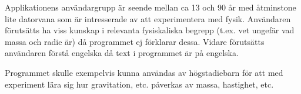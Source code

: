 Applikationens användargrupp är seende mellan ca 13 och 90 år med åtminstone
lite datorvana som är intresserade av att experimentera med fysik.
Användaren förutsätts ha viss kunskap i relevanta fysiskaliska
begrepp (t.ex. vet ungefär vad massa och radie är) då programmet
ej förklarar dessa. Vidare förutsätts användaren förstå engelska
då text i programmet är på engelska.

Programmet skulle exempelvis kunna användas av högstadiebarn för att med 
experiment lära sig hur gravitation, etc. påverkas
av massa, hastighet, etc.

